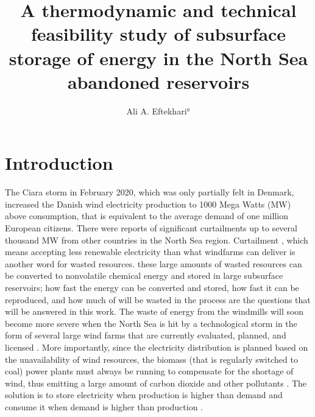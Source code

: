 \documentclass{ECOS_2021}
\title{\sffamily A thermodynamic and technical feasibility study of subsurface storage of energy in the North Sea abandoned reservoirs}
\author{Ali A. Eftekhari$^{a}$}
\begin{document}

\sffamily \section{Introduction} \label{chap:Problem-definition} 
 \normalsize
The Ciara storm in February 2020, which was only partially felt in Denmark, increased
the Danish wind electricity production to 1000 Mega Watts (MW) above
consumption, that is equivalent to the average demand
of one million European citizens. There were reports of significant
curtailments up to several thousand MW from other countries in the
North Sea region. Curtailment \cite{lewWindSolarCurtailment2013},
which means accepting less renewable electricity than what windfarms
can deliver is another word for wasted resources. these large amounts of wasted resources can be converted to nonvolatile chemical energy and stored in large subsurface reservoirs; how fast the energy can be converted and stored, how fast it can be reproduced, and how much of will be wasted in the process are the questions that will be answered in this work. 
The waste of energy from the windmills will soon become
more severe when the North Sea is hit by a technological storm in
the form of several large wind farms that are currently evaluated,
planned, and licensed \cite{GlobalOffshoreRenewable}. More importantly,
since the electricity distribution is planned based on the unavailability
of wind resources, the biomass (that is regularly switched to coal)
power plants must always be running to compensate for the shortage
of wind, thus emitting a large amount of carbon dioxide and other
pollutants \cite{meibomEnergyComesTogether2013}. The solution is
to store electricity when production is higher than demand and consume
it when demand is higher than production \cite{pedersenEnergyStorageTechnologies2019}. 
\end{document}
